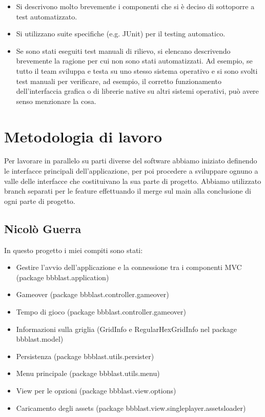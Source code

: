 \documentclass[a4paper,12pt]{report}
\begin{document}
\begin{itemize}
	\item Si descrivono molto brevemente i componenti che si è deciso di sottoporre a test automatizzato.
	\item Si utilizzano suite specifiche (e.g. JUnit) per il testing automatico.
	\item Se sono stati eseguiti test manuali di rilievo, si elencano descrivendo brevemente la ragione per cui non sono stati automatizzati. Ad esempio, se tutto il team sviluppa e testa su uno stesso sistema operativo e si sono svolti test manuali per verificare, ad esempio, il corretto funzionamento dell'interfaccia grafica o di librerie native su altri sistemi operativi, può avere senso menzionare la cosa.
\end{itemize}

\section{Metodologia di lavoro}

Per lavorare in parallelo su parti diverse del software abbiamo iniziato definendo le interfacce principali dell'applicazione, per poi procedere a sviluppare ognuno a valle delle interfacce che costituivano la sua
parte di progetto. Abbiamo utilizzato branch separati per le feature effettuando il merge sul main alla conclusione di ogni parte di progetto.

\subsection{Nicolò Guerra}

In questo progetto i miei compiti sono stati:
\begin{itemize}
	\item Gestire l'avvio dell'applicazione e la connessione tra i componenti MVC (package bbblast.application)
	\item Gameover (package bbblast.controller.gameover)
	\item Tempo di gioco (package bbblast.controller.gameover)
	\item Informazioni sulla griglia (GridInfo e RegularHexGridInfo nel package bbblast.model)
	\item Persistenza (package bbblast.utils.persister)
	\item Menu principale (package bbblast.utils.menu)
	\item View per le opzioni (package bbblast.view.options)
	\item Caricamento degli assets (package bbblast.view.singleplayer.assetsloader)
\end{itemize}
\end{document}
